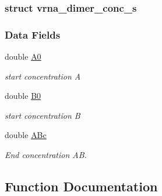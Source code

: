 \subsubsection{struct vrna\+\_\+dimer\+\_\+conc\+\_\+s}
\subsubsection*{Data Fields}
\begin{DoxyCompactItemize}
\item 
\hypertarget{group__pf__cofold_a9722115f1a483583beaf7ef0f8180087}{}double \hyperlink{group__pf__cofold_a9722115f1a483583beaf7ef0f8180087}{A0}\label{group__pf__cofold_a9722115f1a483583beaf7ef0f8180087}

\begin{DoxyCompactList}\small\item\em start concentration A \end{DoxyCompactList}\item 
\hypertarget{group__pf__cofold_a5231715f610413dd5a88bc9f958cf5f3}{}double \hyperlink{group__pf__cofold_a5231715f610413dd5a88bc9f958cf5f3}{B0}\label{group__pf__cofold_a5231715f610413dd5a88bc9f958cf5f3}

\begin{DoxyCompactList}\small\item\em start concentration B \end{DoxyCompactList}\item 
\hypertarget{group__pf__cofold_aef56a1fe8d7f07e7b5d9a65417dda8a4}{}double \hyperlink{group__pf__cofold_aef56a1fe8d7f07e7b5d9a65417dda8a4}{A\+Bc}\label{group__pf__cofold_aef56a1fe8d7f07e7b5d9a65417dda8a4}

\begin{DoxyCompactList}\small\item\em End concentration A\+B. \end{DoxyCompactList}\end{DoxyCompactItemize}


\subsection{Function Documentation}
\hypertarget{group__pf__cofold_ga4e5c7d06c302a7c59fc0d64dc142ca63}{}
